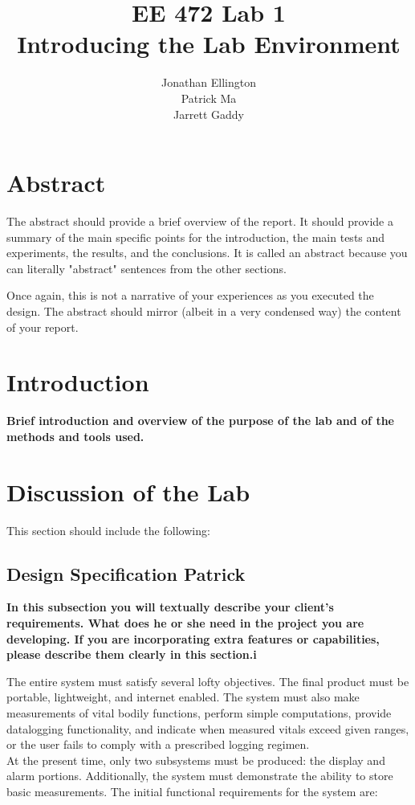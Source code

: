 \documentclass[12pt]{article} %
\title{\TitleFont EE 472 Lab 1 \\ Introducing the Lab Environment \vfill }
\author{\AuthorFont Jonathan Ellington \\ Patrick Ma \\ Jarrett Gaddy}
\date{}
\begin{document}
\maketitle
\thispagestyle{empty}
\pagebreak
\tableofcontents
\listoftables
\listoffigures
\thispagestyle{empty}
\pagebreak
\setcounter{page}{1}

\section{Abstract}
The abstract should provide a brief overview of the report.  It should provide a summary of the main specific points for the introduction, the main tests and experiments, the results, and the conclusions. It is called an abstract because you can literally "abstract" sentences from the other sections. 

Once again, this is not a narrative of your experiences as you executed the design.  The abstract should mirror (albeit in a very condensed way) the content of your report.

\section{Introduction}
\textbf{Brief introduction and overview of the purpose of the lab and of the methods and tools used.}

\section{Discussion of the Lab}

This section should include the following:

\subsection{Design Specification  Patrick}

\textbf{In this subsection you will textually describe your client's requirements.  What does he or she need in the project you are developing.  If you are incorporating extra features or capabilities, please describe them clearly in this section.i}

The entire system must satisfy several lofty objectives. The final product must be portable, lightweight, and internet enabled. The system must also make measurements of vital bodily functions, perform simple computations, provide datalogging functionality, and indicate when measured vitals exceed given ranges, or the user fails to comply with a prescribed logging regimen. \\
At the present time, only two subsystems must be produced: the display and alarm portions. Additionally, the system must demonstrate the ability to store basic measurements. The initial functional requirements for the system are: 
\end{document}
